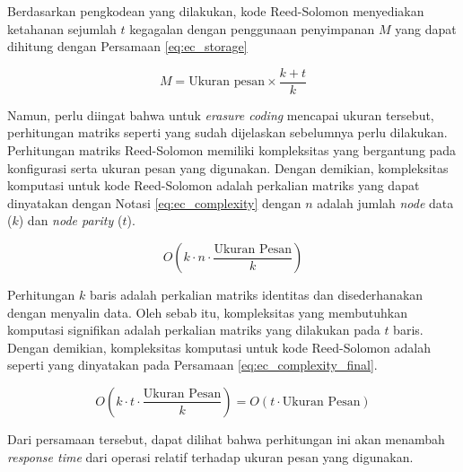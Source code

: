 Berdasarkan pengkodean yang dilakukan, kode Reed-Solomon menyediakan ketahanan sejumlah $t$ kegagalan dengan penggunaan penyimpanan $M$ yang dapat dihitung dengan Persamaan \ref{eq:ec_storage}

\begin{equation}
	M = \text{Ukuran pesan} \times \frac{k + t}{k}
	\label{eq:ec_storage}
\end{equation}

Namun, perlu diingat bahwa untuk \textit{erasure coding} mencapai ukuran tersebut, perhitungan matriks seperti yang sudah dijelaskan sebelumnya perlu dilakukan. Perhitungan matriks Reed-Solomon memiliki kompleksitas yang bergantung pada konfigurasi serta ukuran pesan yang digunakan. Dengan demikian, kompleksitas komputasi untuk kode Reed-Solomon adalah perkalian matriks yang dapat dinyatakan dengan Notasi \ref{eq:ec_complexity} dengan $n$ adalah jumlah \textit{node} data ($k$) dan \textit{node parity} ($t$).

\begin{equation}
	O(k \cdot n \cdot \frac{\text{Ukuran Pesan}}{k})
	\label{eq:ec_complexity}
\end{equation}

Perhitungan $k$ baris adalah perkalian matriks identitas dan disederhanakan dengan menyalin data. Oleh sebab itu, kompleksitas yang membutuhkan komputasi signifikan adalah perkalian matriks yang dilakukan pada $t$ baris. Dengan demikian, kompleksitas komputasi untuk kode Reed-Solomon adalah seperti yang dinyatakan pada Persamaan \ref{eq:ec_complexity_final}.

\begin{equation}
	O(k \cdot t \cdot \frac{\text{Ukuran Pesan}}{k}) = O(t \cdot \text{Ukuran Pesan})
	\label{eq:ec_complexity_final}
\end{equation}

Dari persamaan tersebut, dapat dilihat bahwa perhitungan ini akan menambah \textit{response time} dari operasi relatif terhadap ukuran pesan yang digunakan.
